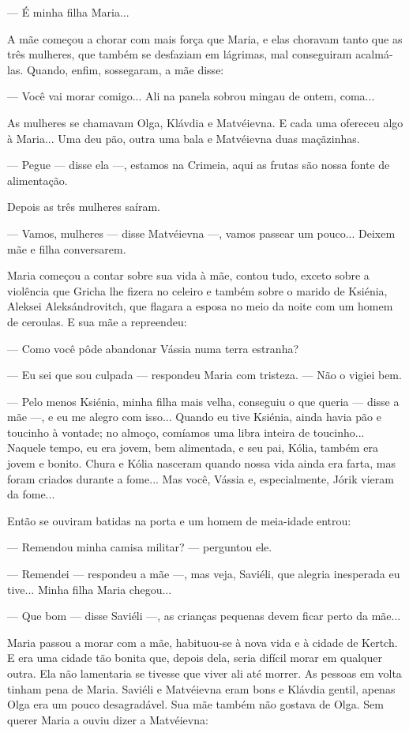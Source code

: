 --- É minha filha Maria...

A mãe começou a chorar com mais força que Maria, e elas choravam tanto
que as três mulheres, que também se desfaziam em lágrimas, mal
conseguiram acalmá-las. Quando, enfim, sossegaram, a mãe disse:

--- Você vai morar comigo... Ali na panela sobrou mingau de ontem,
coma...

As mulheres se chamavam Olga, Klávdia e Matvéievna. E cada uma ofereceu
algo à Maria... Uma deu pão, outra uma bala e Matvéievna duas
maçãzinhas.

--- Pegue --- disse ela ---, estamos na Crimeia, aqui as frutas são
nossa fonte de alimentação.

Depois as três mulheres saíram.

--- Vamos, mulheres --- disse Matvéievna ---, vamos passear um pouco...
Deixem mãe e filha conversarem.

Maria começou a contar sobre sua vida à mãe, contou tudo, exceto sobre a
violência que Gricha lhe fizera no celeiro e também sobre o marido de
Ksiénia, Aleksei Aleksándrovitch, que flagara a esposa no meio da noite
com um homem de ceroulas. E sua mãe a repreendeu:

--- Como você pôde abandonar Vássia numa terra estranha?

--- Eu sei que sou culpada --- respondeu Maria com tristeza. --- Não o
vigiei bem.

--- Pelo menos Ksiénia, minha filha mais velha, conseguiu o que queria
--- disse a mãe ---, e eu me alegro com isso... Quando eu tive Ksiénia,
ainda havia pão e toucinho à vontade; no almoço, comíamos uma libra
inteira de toucinho... Naquele tempo, eu era jovem, bem alimentada, e
seu pai, Kólia, também era jovem e bonito. Chura e Kólia nasceram quando
nossa vida ainda era farta, mas foram criados durante a fome... Mas
você, Vássia e, especialmente, Jórik vieram da fome...

Então se ouviram batidas na porta e um homem de meia-idade entrou:

--- Remendou minha camisa militar? --- perguntou ele.

--- Remendei --- respondeu a mãe ---, mas veja, Saviéli, que alegria
inesperada eu tive... Minha filha Maria chegou...

--- Que bom --- disse Saviéli ---, as crianças pequenas devem ficar
perto da mãe...

Maria passou a morar com a mãe, habituou-se à nova vida e à cidade de
Kertch. E era uma cidade tão bonita que, depois dela, seria difícil
morar em qualquer outra. Ela não lamentaria se tivesse que viver ali até
morrer. As pessoas em volta tinham pena de Maria. Saviéli e Matvéievna
eram bons e Klávdia gentil, apenas Olga era um pouco desagradável. Sua
mãe também não gostava de Olga. Sem querer Maria a ouviu dizer a
Matvéievna:

